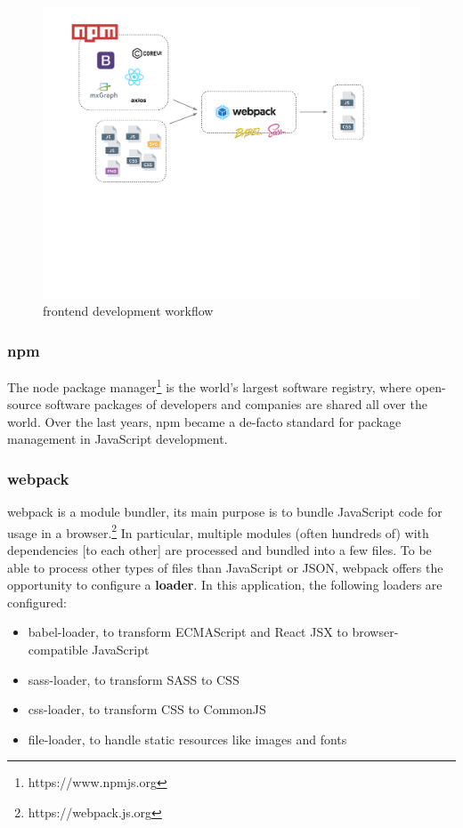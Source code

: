 \documentclass[a4paper,11pt,pdftex,halfparskip,cleardoubleempty]{scrbook}
\begin{document}
\begin{figure}[htbp]
  \centering
  \includegraphics[trim={0 6.2cm 3.4cm 0},scale=0.6]{img/frontend-setup}
  \caption{frontend development workflow}
\end{figure}

\subsubsection{npm}

The node package manager\footnote{https://www.npmjs.org} is the world's largest software registry, where open-source software packages of developers and companies are shared all over the world. Over the last years, npm became a de-facto standard for package management in JavaScript development.

\subsubsection{webpack}

webpack is a module bundler, its main purpose is to bundle JavaScript code for usage in a browser.\footnote{https://webpack.js.org} In particular, multiple modules (often hundreds of) with dependencies [to each other] are processed and bundled into a few files. To be able to process other types of files than JavaScript or JSON, webpack offers the opportunity to configure a \textbf{loader}. In this application, the following loaders are configured:
\begin{itemize}
\item babel-loader, to transform ECMAScript and React JSX to browser-compatible JavaScript
\item sass-loader, to transform SASS to CSS
\item css-loader, to transform CSS to CommonJS
\item file-loader, to handle static resources like images and fonts
\end{itemize}
\end{document}
